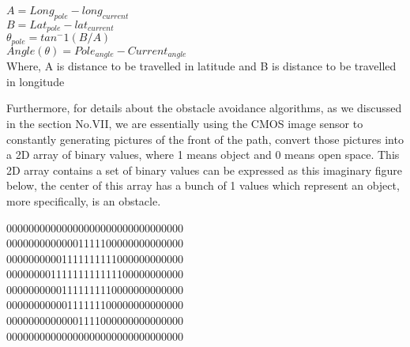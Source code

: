 \documentclass[10pt,letterpaper,onecolumn,journal]{IEEEtran}
\begin{document}
\begin{center}
$A = Long_{pole} - long_{current}$\\
$B = Lat_{pole}  - lat_{current}$\\
$\theta_{pole} = tan^-1(B/A)$\\
$Angle(\theta) = Pole_{angle}  - Current_{angle}$\\
\vspace{.3cm}
Where, A is distance to be travelled in latitude and B is distance to be travelled in longitude\\
\end{center}
\newpage
Furthermore, for details about the obstacle avoidance algorithms, as we discussed in the section No.VII, we are essentially using the CMOS image sensor to constantly generating pictures of the front of the path, convert those pictures into a 2D array of binary values, where 1 means object and 0 means open space. \cite{astarkfuture} This 2D array contains a set of binary values can be expressed as this imaginary figure below, the center of this array has a bunch of 1 values which represent an object, more specifically, is an obstacle. \vspace{.3cm}
\begin{center}
00000000000000000000000000000000\\
00000000000001111100000000000000\\
00000000001111111111000000000000\\
00000000111111111111100000000000\\
00000000001111111110000000000000\\
00000000000111111100000000000000\\
00000000000001111000000000000000\\
00000000000000000000000000000000\\
\end{center}
\vspace{.3cm}
\end{document}
